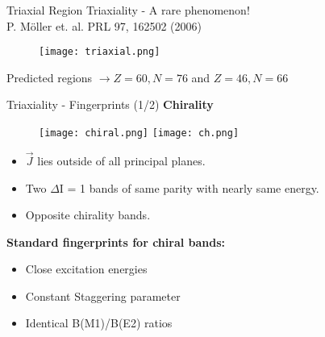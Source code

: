 \documentclass [11pt]{beamer}
\begin{document}
\begin{frame}{Triaxial Region}
\centering
Triaxiality - A rare phenomenon!\\
\tiny {P. M\"{o}ller et. al. PRL 97, 162502 (2006)}
\begin{figure}
\texttt{[image: triaxial.png]}
\end{figure}
\small {Predicted regions $\rightarrow Z = 60, N = 76$ and $Z = 46, N = 66$}
\end{frame}

\begin{frame}{Triaxiality - Fingerprints (1/2)}
\vspace{-6pt}
\textbf{\large \color{red} Chirality}
\vspace{-6pt}
\begin{center}
\begin{figure}
\texttt{[image: chiral.png]}
\hspace{5pt}
\texttt{[image: ch.png]}
\end{figure}
\end{center}
\vspace{-7pt}
\begin{itemize}
\item {\textbf{$\vec{J}$} lies outside of all principal planes.}
\item {Two $\Delta\mathrm{I}$ = 1 bands of same parity with nearly same energy.}
\item {Opposite chirality bands.}
\end{itemize}
\vspace{-4pt}
\textbf{Standard fingerprints for chiral bands:}
\begin{itemize}
\item{Close excitation energies}
\item{Constant Staggering parameter}
\item{Identical B(M1)/B(E2) ratios}
\end{itemize}
\end{frame}
\end{document}
